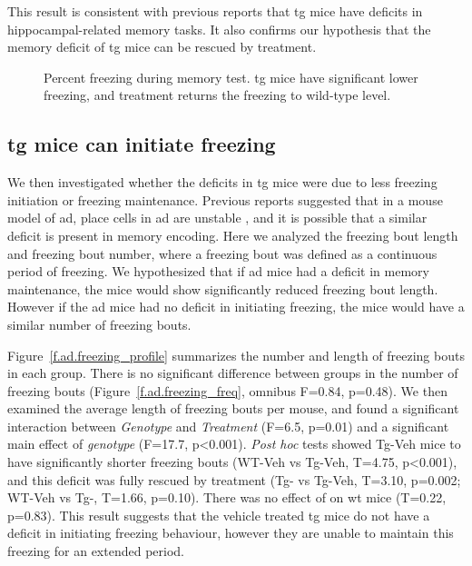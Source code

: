 This result is consistent with previous reports \citep{palmer11, zhou16} that \gls{tg} mice have deficits in hippocampal-related memory tasks. It also confirms our hypothesis that the memory deficit of \gls{tg} mice can be rescued by \tglu{} treatment. 

\begin{figure}[h]
    
    \caption[Percent of freezing during memory test.]{Percent freezing during memory test. \Gls{tg} mice have significant lower freezing, and \tglu{} treatment returns the freezing to wild-type level. \label{f.ad.freezing}}
\end{figure}

\subsection{\Gls{tg} mice can initiate freezing}
We then investigated whether the deficits in \gls{tg} mice were due to less freezing initiation or freezing maintenance. Previous reports suggested that in a mouse model of \gls{ad}, place cells in \gls{ad} are unstable \citep{cheng13}, and it is possible that a similar deficit is present in memory encoding. Here we analyzed the freezing bout length and freezing bout number, where a freezing bout was defined as a continuous period of freezing. We hypothesized that if  \gls{ad} mice had a deficit in memory maintenance, the mice would show significantly reduced freezing bout length. However if the \gls{ad} mice had no deficit in initiating freezing, the mice would have a similar number of freezing bouts.

Figure~\ref{f.ad.freezing_profile} summarizes the number and length of freezing bouts in each group. There is no significant difference between groups in the number of freezing bouts (Figure~\ref{f.ad.freezing_freq}, omnibus F=0.84, p=0.48). We then examined the average length of freezing bouts per mouse, and found a significant interaction between \textit{Genotype} and \textit{Treatment} (F=6.5, p=0.01) and a significant main effect of \textit{genotype} (F=17.7, p<0.001). \textit{Post hoc} tests showed Tg-Veh mice to have significantly shorter freezing bouts (WT-Veh vs Tg-Veh, T=4.75, p<0.001), and this deficit was fully rescued by \tglu{} treatment (Tg-\glu{} vs Tg-Veh, T=3.10, p=0.002; WT-Veh vs Tg-\glu, T=1.66, p=0.10). There was no effect of \tglu{} on \gls{wt} mice (T=0.22, p=0.83). This result suggests that the vehicle treated \gls{tg} mice do not have a deficit in initiating freezing behaviour, however they are unable to maintain this freezing for an extended period. 

